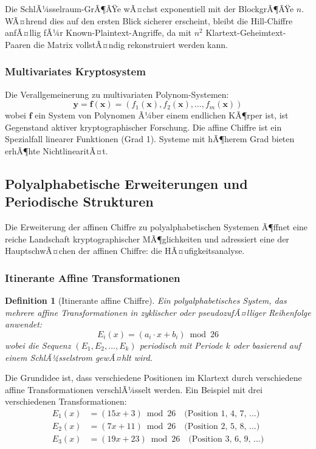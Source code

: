 ﻿\documentclass[12pt,a4paper]{article}
\newtheorem{definition}{Definition}
\begin{document}
	Die SchlÃ¼sselraum-GrÃ¶ÃŸe wÃ¤chst exponentiell mit der BlockgrÃ¶ÃŸe $n$. WÃ¤hrend dies auf den ersten Blick sicherer erscheint, bleibt die Hill-Chiffre anfÃ¤llig fÃ¼r Known-Plaintext-Angriffe, da mit $n^2$ Klartext-Geheimtext-Paaren die Matrix vollstÃ¤ndig rekonstruiert werden kann.
	
	\subsubsection{Multivariates Kryptosystem}
	
	Die Verallgemeinerung zu multivariaten Polynom-Systemen:
	\begin{equation}
		\mathbf{y} = \mathbf{f}(\mathbf{x}) = (f_1(\mathbf{x}), f_2(\mathbf{x}), \ldots, f_m(\mathbf{x}))
	\end{equation}
	wobei $\mathbf{f}$ ein System von Polynomen Ã¼ber einem endlichen KÃ¶rper ist, ist Gegenstand aktiver kryptographischer Forschung. Die affine Chiffre ist ein Spezialfall linearer Funktionen (Grad 1). Systeme mit hÃ¶herem Grad bieten erhÃ¶hte NichtlinearitÃ¤t.
	
	
	\subsection{Polyalphabetische Erweiterungen und Periodische Strukturen}
	
	Die Erweiterung der affinen Chiffre zu polyalphabetischen Systemen Ã¶ffnet eine reiche Landschaft kryptographischer MÃ¶glichkeiten und adressiert eine der HauptschwÃ¤chen der affinen Chiffre: die HÃ¤ufigkeitsanalyse.
	
	\subsubsection{Itinerante Affine Transformationen}
	
	\begin{definition}[Itinerante affine Chiffre]
		Ein polyalphabetisches System, das mehrere affine Transformationen in zyklischer oder pseudozufÃ¤lliger Reihenfolge anwendet:
		\begin{equation}
			E_i(x) = (a_i \cdot x + b_i) \bmod 26
		\end{equation}
		wobei die Sequenz $(E_1, E_2, \ldots, E_k)$ periodisch mit Periode $k$ oder basierend auf einem SchlÃ¼sselstrom gewÃ¤hlt wird.
	\end{definition}
	
	Die Grundidee ist, dass verschiedene Positionen im Klartext durch verschiedene affine Transformationen verschlÃ¼sselt werden. Ein Beispiel mit drei verschiedenen Transformationen:
	\begin{align}
		E_1(x) &= (15x + 3) \bmod 26 \quad \text{(Position 1, 4, 7, ...)} \\
		E_2(x) &= (7x + 11) \bmod 26 \quad \text{(Position 2, 5, 8, ...)} \\
		E_3(x) &= (19x + 23) \bmod 26 \quad \text{(Position 3, 6, 9, ...)}
	\end{align}
	
\end{document}
